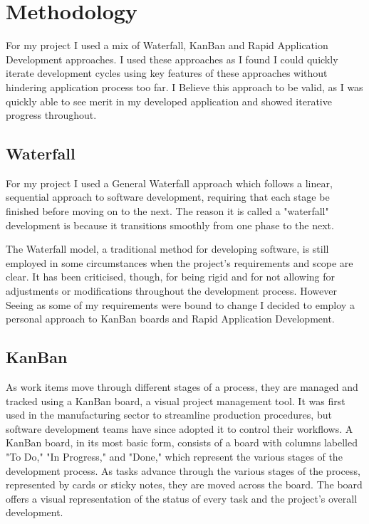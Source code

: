 \chapter{Methodology}

For my project I used a mix of Waterfall, KanBan and Rapid Application Development approaches. I used these approaches as I found I could quickly iterate development cycles using key features of these approaches without hindering application process too far. I Believe this approach to be valid, as I was quickly able to see merit in my developed application and showed iterative progress throughout. 

\section{Waterfall}

For my project I used a General Waterfall approach which follows a linear, sequential approach to software development, requiring that each stage be finished before moving on to the next. The reason it is called a "waterfall" development is because it transitions smoothly from one phase to the next.\cite{al2017project}

The Waterfall model, a traditional method for developing software, is still employed in some circumstances when the project's requirements and scope are clear. It has been criticised, though, for being rigid and for not allowing for adjustments or modifications throughout the development process.\cite{al2017project} However Seeing as some of my requirements were bound to change I decided to employ a personal approach to KanBan boards and Rapid Application Development.

\section{KanBan}

As work items move through different stages of a process, they are managed and tracked using a KanBan board, a visual project management tool. It was first used in the manufacturing sector to streamline production procedures, but software development teams have since adopted it to control their workflows.\cite{patel2018kanban}
A KanBan board, in its most basic form, consists of a board with columns labelled "To Do," "In Progress," and "Done," which represent the various stages of the development process. As tasks advance through the various stages of the process, represented by cards or sticky notes, they are moved across the board. The board offers a visual representation of the status of every task and the project's overall development.\cite{pressman2015software}

